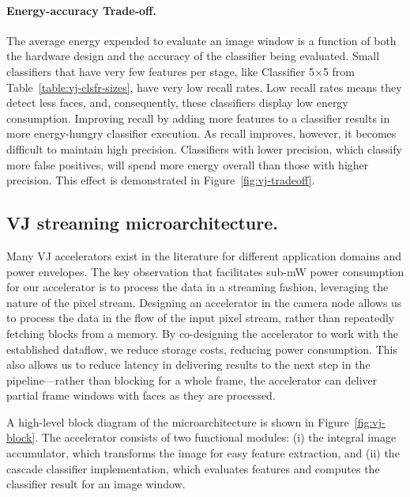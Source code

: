 \paragraph{Energy-accuracy Trade-off.} The average energy expended to evaluate an image window
is a function of both the hardware design and the accuracy of the classifier being evaluated.
Small classifiers that have very few features per stage, like Classifier 5$\times$5 from
Table~\ref{table:vj-clsfr-sizes}, have very low recall rates. Low recall rates means they detect less
faces, and, consequently, these classifiers display low energy consumption. Improving recall by
adding more features to a classifier results in more energy-hungry classifier execution. As recall
improves, however, it becomes difficult to maintain high precision. Classifiers with lower precision,
which classify more false positives, will spend more energy overall than those with higher precision.
This effect is demonstrated in Figure~\ref{fig:vj-tradeoff}.


\subsection{VJ streaming microarchitecture.}
Many VJ accelerators exist in the literature for different application domains and power envelopes.
The key observation that facilitates sub-mW power consumption for our accelerator is to process the data in a streaming fashion, leveraging the nature of the pixel stream.
Designing an accelerator in the camera node allows us to process the data in the flow of the input pixel stream, rather than repeatedly fetching blocks from a memory.
By co-designing the accelerator to work with the established dataflow, we reduce storage costs, reducing power consumption.
This also allows us to reduce latency in delivering results to the next step in the pipeline---rather than blocking for a whole frame, the accelerator can deliver partial frame windows with faces as they are processed.

A high-level block diagram of the microarchitecture is shown in Figure~\ref{fig:vj-block}. The accelerator consists of two functional modules: (i) the integral image accumulator, which transforms the image for easy feature extraction, and (ii) the cascade classifier implementation, which evaluates features and computes the classifier result for an image window.

